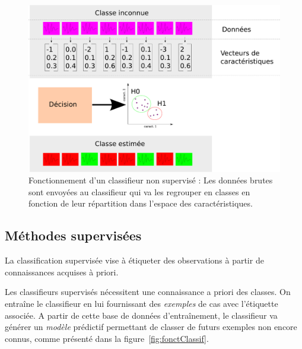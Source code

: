 \begin{figure}[h]
	\begin{center}
	\includegraphics[width=15cm]{images/fonctionnementClassifNonSup}
	\end{center}
	\caption{Fonctionnement d'un classifieur non supervisé : Les données brutes sont envoyées au classifieur qui va les regrouper en classes en fonction de leur répartition dans l'espace des caractéristiques.}
	\label{fig:fonctionnementClassifNonSup}
\end{figure}


		\subsection{Méthodes supervisées}

La classification supervisée vise à étiqueter des observations à partir de connaissances acquises à priori.

Les classifieurs supervisés nécessitent une connaissance a priori des classes. On entraîne le classifieur en lui fournissant des \emph{exemples} de cas avec l'étiquette associée. A partir de cette base de données d'entraînement, le classifieur va générer un \emph{modèle} prédictif permettant de classer de futurs exemples non encore connus, comme présenté dans la figure~\ref{fig:fonctClassif}.

